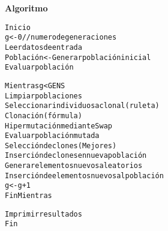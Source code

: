 \textbf{Algoritmo}

\begin{alltt}
    Inicio
    g <- 0 // numero de generaciones
    Leer datos de entrada
    Población <- Generar población inicial
    Evaluar población

    Mientras g < GENS
        Limpiar poblaciones
        Seleccionar individuos a clonal (ruleta)
        Clonación (fórmula)
        Hipermutación mediante Swap
        Evaluar población mutada
        Selección de clones (Mejores)
        Inserción de clones en nueva población
        Generar elementos nuevos aleatorios
        Inserción de elementos nuevos al población
        g <- g + 1
    Fin Mientras

    Imprimir resultados
    Fin
\end{alltt}
